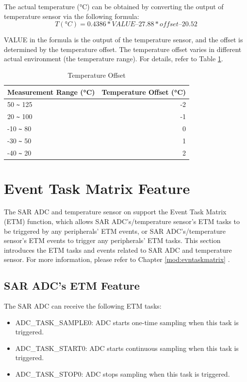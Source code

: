 \documentclass[main\_\_EN.tex]{subfiles}
\begin{document}
The actual temperature (°C) can be obtained by converting the output of temperature sensor via the following formula:
\[
        T(°C) = 0.4386 * VALUE – 27.88 * offset – 20.52
\]

VALUE in the formula is the output of the temperature sensor, and the offset is determined by the temperature offset. The temperature offset varies in different actual environment (the temperature range). For details, refer to Table \ref{tab:tsensor-dac}.

\begin{longtable}[c]{|p{4cm}|r|}
    \caption{Temperature Offset}
    \label{tab:tsensor-dac}
    \\\hline
    \rowcolor{lightgray}
    Measurement Range (°C)  & Temperature Offset (°C) \\\hline
    50 \verb+~+ 125 & -2 \\\hline
    20 \verb+~+ 100 & -1 \\\hline
    -10 \verb+~+ 80 & 0 \\\hline
    -30 \verb+~+ 50 & 1 \\\hline
    -40 \verb+~+ 20 & 2 \\\hline
\end{longtable}


\section{Event Task Matrix Feature}
\label{sec:sensor-etm-func}

The SAR ADC and temperature sensor on \chipname{} support the Event Task Matrix (ETM) function, which allows SAR ADC's/temperature sensor's ETM tasks to be triggered by any peripherals' ETM events, or SAR ADC's/temperature sensor's ETM events to trigger any peripherals' ETM tasks. This section introduces the ETM tasks and events related to SAR ADC and temperature sensor. For more information, please refer to Chapter \ref{mod:evntaskmatrix} .

\subsection{SAR ADC's ETM Feature}

The SAR ADC can receive the following ETM tasks:

\begin{itemize}
    \item ADC\_TASK\_SAMPLE0: ADC starts one-time sampling when this task is triggered.
    \item ADC\_TASK\_START0: ADC starts continuous sampling when this task is triggered.
    \item ADC\_TASK\_STOP0: ADC stops sampling when this task is triggered.
\end{itemize}
\end{document}
